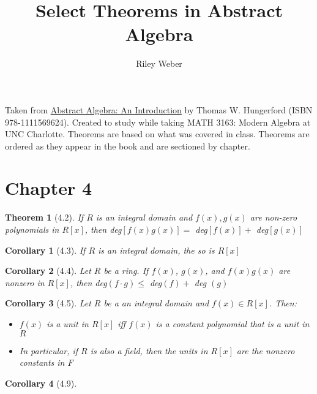 \documentclass{article}
\theoremstyle{break}
\newtheorem*{theorem*}{Theorem}
\newtheorem*{corollary*}{Corollary}
\begin{document}
\title{Select Theorems in Abstract Algebra}
\author{Riley Weber}
\maketitle

Taken from \underline{Abstract Algebra: An Introduction} by Thomas W.
Hungerford (ISBN 978-1111569624). Created to study while taking MATH 3163:
Modern Algebra at UNC Charlotte. Theorems are based on what was covered in
class. Theorems are ordered as they appear in the book and are sectioned by
chapter.

\section*{Chapter 4}
\begin{theorem*}[4.2]
  If $R$ is an integral domain and $f(x), g(x)$ are non-zero polynomials in
  $R[x]$, then deg$[f(x)g(x)] = $ deg$[f(x)] +$ deg$[g(x)]$
\end{theorem*}

\begin{corollary*}[4.3]
  If $R$ is an integral domain, the so is $R[x]$
\end{corollary*}

\begin{corollary*}[4.4]
  Let $R$ be a ring. If $f(x)$, $g(x)$, and $f(x)g(x)$ are nonzero in $R[x]$,
  then deg$(f \cdot g) \leq $ deg$(f) + $ deg $(g)$
\end{corollary*}

\begin{corollary*}[4.5]
  Let $R$ be a an integral domain and $f(x) \in R[x]$. Then:
  \begin{itemize}
    \item $f(x)$ is a unit in $R[x]$ iff $f(x)$ is a constant polynomial that
    is a unit in $R$
    \item In particular, if $R$ is also a field, then the units in $R[x]$ are
    the nonzero constants in $F$
  \end{itemize}
\end{corollary*}

\begin{corollary*}[4.9]
\end{corollary*}

\end{document}
